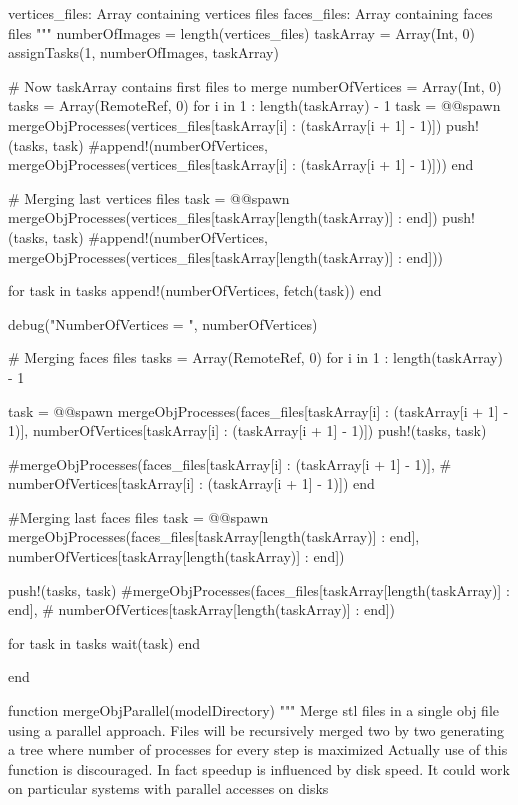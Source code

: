 \documentclass[11pt,oneside]{article}	%
\begin{document}
{  vertices_files: Array containing vertices files
  faces_files: Array containing faces files
  """
  numberOfImages = length(vertices_files)
  taskArray = Array(Int, 0)
  assignTasks(1, numberOfImages, taskArray)

  # Now taskArray contains first files to merge
  numberOfVertices = Array(Int, 0)
  tasks = Array(RemoteRef, 0)
  for i in 1 : length(taskArray) - 1
    task = @@spawn mergeObjProcesses(vertices_files[taskArray[i] : (taskArray[i + 1] - 1)])
    push!(tasks, task)
    #append!(numberOfVertices, mergeObjProcesses(vertices_files[taskArray[i] : (taskArray[i + 1] - 1)]))
  end

  # Merging last vertices files
  task = @@spawn mergeObjProcesses(vertices_files[taskArray[length(taskArray)] : end])
  push!(tasks, task)
  #append!(numberOfVertices, mergeObjProcesses(vertices_files[taskArray[length(taskArray)] : end]))


  for task in tasks
    append!(numberOfVertices, fetch(task))
  end

  debug("NumberOfVertices = ", numberOfVertices)

  # Merging faces files
  tasks = Array(RemoteRef, 0)
  for i in 1 : length(taskArray) - 1

    task = @@spawn mergeObjProcesses(faces_files[taskArray[i] : (taskArray[i + 1] - 1)],
                                    numberOfVertices[taskArray[i] : (taskArray[i + 1] - 1)])
    push!(tasks, task)

    #mergeObjProcesses(faces_files[taskArray[i] : (taskArray[i + 1] - 1)],
    #                  numberOfVertices[taskArray[i] : (taskArray[i + 1] - 1)])
  end

  #Merging last faces files
  task = @@spawn mergeObjProcesses(faces_files[taskArray[length(taskArray)] : end],
                                  numberOfVertices[taskArray[length(taskArray)] : end])

  push!(tasks, task)
  #mergeObjProcesses(faces_files[taskArray[length(taskArray)] : end],
  #                    numberOfVertices[taskArray[length(taskArray)] : end])

  for task in tasks
    wait(task)
  end

end

function mergeObjParallel(modelDirectory)
  """
  Merge stl files in a single obj file using a parallel
  approach. Files will be recursively merged two by two
  generating a tree where number of processes for every
  step is maximized
  Actually use of this function is discouraged. In fact
  speedup is influenced by disk speed. It could work on
  particular systems with parallel accesses on disks

}
\end{document}
